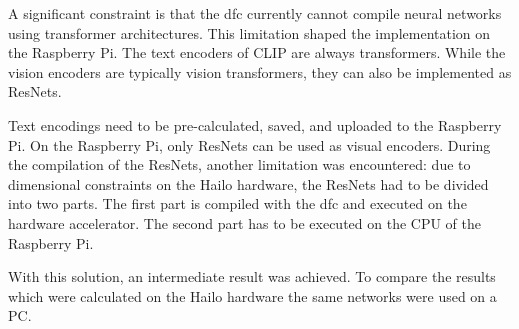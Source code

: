 A significant constraint is that the \acrshort{dfc} currently cannot compile neural networks using transformer architectures.
This limitation shaped the implementation on the Raspberry Pi.  
The text encoders of CLIP are always transformers.  
While the vision encoders are typically vision transformers, they can also be implemented as ResNets.  

Text encodings need to be pre-calculated, saved, and uploaded to the Raspberry Pi.  
On the Raspberry Pi, only ResNets can be used as visual encoders.  
During the compilation of the ResNets, another limitation was encountered: due to dimensional constraints on the Hailo hardware, the ResNets had to be divided into two parts.  
The first part is compiled with the \acrshort{dfc} and executed on the hardware accelerator.  
The second part has to be executed on the CPU of the Raspberry Pi.  

With this solution, an intermediate result was achieved.
To compare the results which were calculated on the Hailo hardware the same networks were used on a PC.





